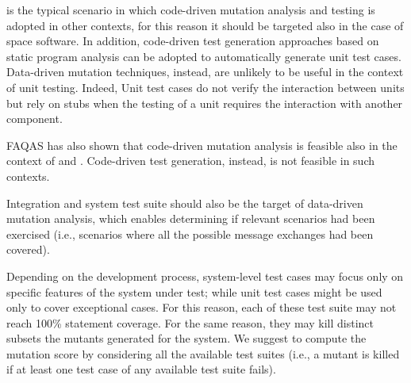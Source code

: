 
 is the typical scenario in which code-driven mutation analysis and testing is adopted in other contexts, for this reason it should be targeted also in the case of space software.
In addition, code-driven test generation approaches based on static program analysis can be adopted to automatically generate unit test cases.
Data-driven mutation techniques, instead, are unlikely to be useful in the context of unit testing.
Indeed, Unit test cases do not verify the interaction between units but rely on stubs when the testing of a unit requires the interaction with another component.

FAQAS has also shown that code-driven mutation analysis is feasible also in the context of  and . Code-driven test generation, instead, is not feasible in such contexts.

Integration and system test suite should also be the target of data-driven mutation analysis, which enables determining if relevant scenarios had been exercised (i.e., scenarios where all the possible message exchanges had been covered). 


Depending on the development process, system-level test cases may focus only on specific features of the system under test; while unit test cases might be used only to cover exceptional cases. For this reason, each of these test suite may not reach 100\% statement coverage. For the same reason, they may kill distinct subsets the mutants generated for the system. 
We suggest to compute the mutation score by considering all the available test suites (i.e., a mutant is killed if at least one test case of any available test suite fails).


